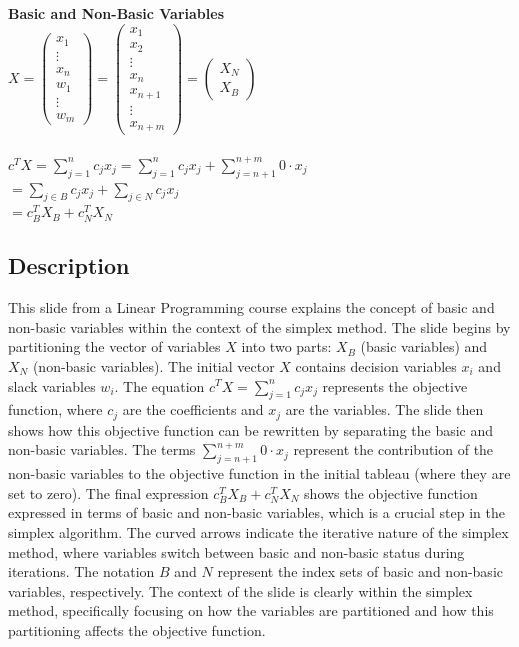\documentclass{article}%
\begin{document}
\textbf{Basic and Non-Basic Variables} \\
$X = \begin{pmatrix} x_1 \\ \vdots \\ x_n \\ w_1 \\ \vdots \\ w_m \end{pmatrix} = \begin{pmatrix} x_1 \\ x_2 \\ \vdots \\ x_n \\ x_{n+1} \\ \vdots \\ x_{n+m} \end{pmatrix} = \begin{pmatrix} X_N \\ X_B \end{pmatrix}$
\qquad {} \\
\qquad {} \\
$c^T X = \sum_{j=1}^n c_j x_j = \sum_{j=1}^n c_j x_j + \sum_{j=n+1}^{n+m} 0 \cdot x_j$ \\
$= \sum_{j \in B} c_j x_j + \sum_{j \in N} c_j x_j$ \\
$= c_B^T X_B + c_N^T X_N$
%
\subsection{Description}%
This slide from a Linear Programming course explains the concept of basic and non-basic variables within the context of the simplex method.  The slide begins by partitioning the vector of variables $X$ into two parts: $X_B$ (basic variables) and $X_N$ (non-basic variables). The initial vector $X$ contains decision variables $x_i$ and slack variables $w_i$.  The equation $c^T X = \sum_{j=1}^n c_j x_j$ represents the objective function, where $c_j$ are the coefficients and $x_j$ are the variables.  The slide then shows how this objective function can be rewritten by separating the basic and non-basic variables. The terms $\sum_{j=n+1}^{n+m} 0 \cdot x_j$ represent the contribution of the non-basic variables to the objective function in the initial tableau (where they are set to zero). The final expression $c_B^T X_B + c_N^T X_N$ shows the objective function expressed in terms of basic and non-basic variables, which is a crucial step in the simplex algorithm. The curved arrows indicate the iterative nature of the simplex method, where variables switch between basic and non-basic status during iterations. The notation $B$ and $N$ represent the index sets of basic and non-basic variables, respectively. The context of the slide is clearly within the simplex method, specifically focusing on how the variables are partitioned and how this partitioning affects the objective function.%
\end{document}
